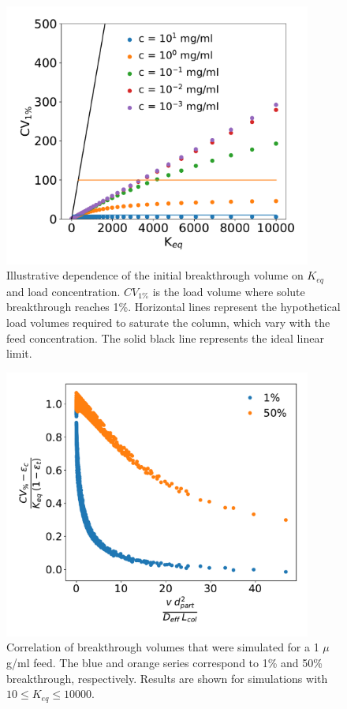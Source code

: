 \documentclass[11pt,a4paper]{article}
\begin{document}
\begin{figure}[bp]
            \centering
            \includegraphics[width=0.9\textwidth]{cv_1_percent_vs_Keq}
            \caption{Illustrative dependence of the initial breakthrough volume on $K_{eq}$ and load concentration. $CV_{1\%}$ is the load volume where solute breakthrough reaches 1\%. Horizontal lines represent the hypothetical load volumes required to saturate the column, which vary with the feed concentration. The solid black line represents the ideal linear limit.}
            \label{fig:initial breakthrough volumes vs Keq}
\end{figure}


\begin{figure}[bp]
            \centering
            \includegraphics[width=0.9\textwidth]{correlation_breakthrough_volume}
            \caption{Correlation of breakthrough volumes that were simulated for a 1 $\mu$g/ml feed. The blue and orange series correspond to 1\% and 50\% breakthrough, respectively. Results are shown for simulations with $10 \leq K_{eq} \leq 10000$.}
            \label{fig:correlation of breakthrough volumes}
\end{figure}
\end{document}
